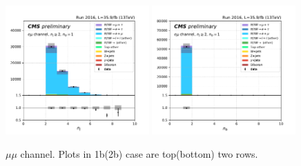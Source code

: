 \begin{figure}[ht]
    \includegraphics[width=0.49\textwidth]{chapters/Appendix/sectionPlots/figures/kinematics_pickles/emu2/1b/emu2_1b_nJets.pdf}
    \includegraphics[width=0.49\textwidth]{chapters/Appendix/sectionPlots/figures/kinematics_pickles/emu2/1b/emu2_1b_nBJets.pdf}
    
    \caption{$\mu\mu$ channel. Plots in 1b(2b) case are top(bottom) two rows.}
\end{figure}

